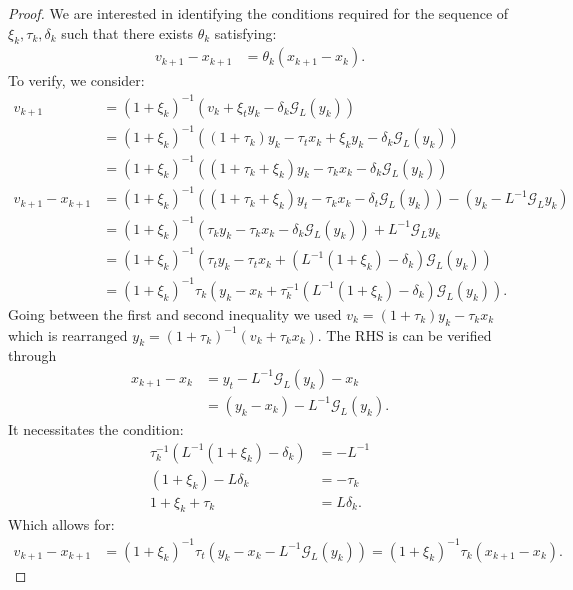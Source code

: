 \documentclass[12pt]{article}
\begin{document}
    \begin{proof}
        We are interested in identifying the conditions required for the sequence of $\xi_k, \tau_k, \delta_k$ such that there exists $\theta_k$ satisfying: 
        \begin{align*}
            v_{k + 1} - x_{k + 1} 
            &= \theta_k(x_{k + 1} - x_k).
        \end{align*}
        To verify, we consider:
        \begin{align*}
            v_{k + 1} &= 
            (1 + \xi_k)^{-1}(v_k + \xi_t y_k - \delta_k \mathcal G_L(y_k))
            \\
            &= 
            (1 + \xi_k)^{-1}((1 + \tau_k)y_k - \tau_t x_k + \xi_k y_k - \delta_k \mathcal G_L(y_k))
            \\
            &= 
            (1 + \xi_k)^{-1}((1 + \tau_k + \xi_k)y_k - \tau_k x_k - \delta_k \mathcal G_L(y_k))
            \\
            v_{k + 1} - x_{k + 1}
            &= 
            (1 + \xi_k)^{-1}((1 + \tau_k + \xi_k)y_t - \tau_k x_k - \delta_t \mathcal G_L(y_k))
            - (y_k - L^{-1}\mathcal G_Ly_k)
            \\
            &= 
            (1 + \xi_k)^{-1}(\tau_ky_k - \tau_k x_k - \delta_k \mathcal G_L(y_k))
            + L^{-1}\mathcal G_Ly_k
            \\
            &= 
            (1 + \xi_k)^{-1}
            \left(
                \tau_ty_k - \tau_t x_k + (L^{-1}(1 + \xi_k) - \delta_k) \mathcal G_L(y_k)
            \right)
            \\
            &= 
            (1 + \xi_k)^{-1}\tau_k
            \left(
                y_k - x_k + 
                \tau_k^{-1}(L^{-1}(1 + \xi_k) - \delta_k) \mathcal G_L(y_k)
            \right).
        \end{align*}
        Going between the first and second inequality we used $v_k = (1 + \tau_k)y_k - \tau_k x_k$ which is rearranged $y_k = (1 + \tau_k)^{-1}(v_k + \tau_k x_k)$. 
        The RHS is can be verified through 
        \begin{align*}
            x_{k + 1} - x_k &= 
            y_t - L^{-1}\mathcal G_L(y_k) - x_k
            \\
            &= (y_k - x_k) - L^{-1}\mathcal G_L(y_k). 
        \end{align*}
        It necessitates the condition: 
        \begin{align*}
            \tau_k^{-1}(L^{-1}(1 + \xi_k) - \delta_k) 
            &= - L^{-1}
            \\
            (1 + \xi_k) - L\delta_k
            &= 
            - \tau_k
            \\
            1 + \xi_k + \tau_k
            &=
            L\delta_k. 
        \end{align*}
        Which allows for: 
        \begin{align*}
            v_{k + 1} - x_{k + 1} &= 
            (1 + \xi_k)^{-1}\tau_t
            \left(y_k - x_k - L^{-1}\mathcal G_L(y_k)\right) 
            = 
            (1 + \xi_k)^{-1}\tau_k(x_{k + 1} - x_k). 
        \end{align*}
    \end{proof}
\end{document}
